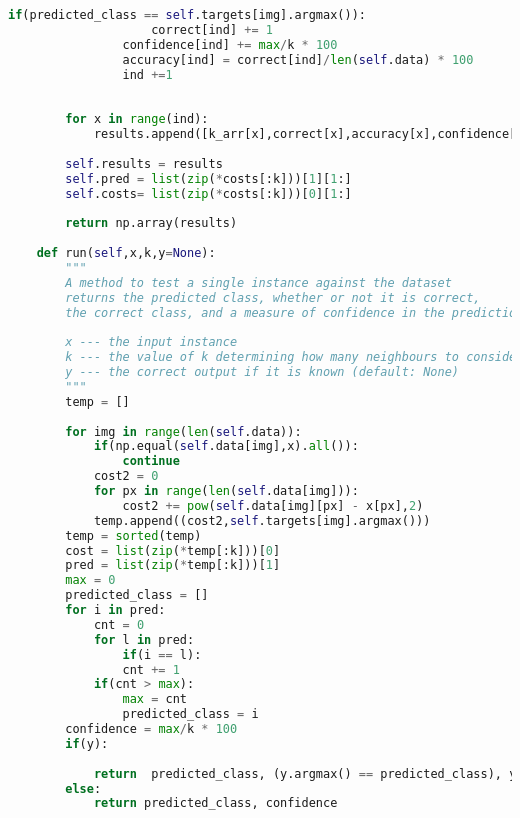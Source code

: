 \begin{lstlisting}[language=Python, caption=K Nearest Neighbours, captionpos=b, label={list:knn}]
				if(predicted_class == self.targets[img].argmax()):
					correct[ind] += 1
				confidence[ind] += max/k * 100
				accuracy[ind] = correct[ind]/len(self.data) * 100
				ind +=1 
		
		
		for x in range(ind):
			results.append([k_arr[x],correct[x],accuracy[x],confidence[x]])
		
		self.results = results  
		self.pred = list(zip(*costs[:k]))[1][1:]
		self.costs= list(zip(*costs[:k]))[0][1:]
		
		return np.array(results)
	
	def run(self,x,k,y=None):
		"""
		A method to test a single instance against the dataset
		returns the predicted class, whether or not it is correct, 
		the correct class, and a measure of confidence in the prediction
		
		x --- the input instance
		k --- the value of k determining how many neighbours to consider
		y --- the correct output if it is known (default: None)
		"""
		temp = []
		
		for img in range(len(self.data)):
			if(np.equal(self.data[img],x).all()):
				continue
			cost2 = 0
			for px in range(len(self.data[img])):
				cost2 += pow(self.data[img][px] - x[px],2)
			temp.append((cost2,self.targets[img].argmax()))
		temp = sorted(temp)
		cost = list(zip(*temp[:k]))[0]
		pred = list(zip(*temp[:k]))[1] 
		max = 0
		predicted_class = []
		for i in pred:
			cnt = 0
			for l in pred:	
				if(i == l):
				cnt += 1
			if(cnt > max):
				max = cnt
				predicted_class = i
		confidence = max/k * 100
		if(y):
		
			return  predicted_class, (y.argmax() == predicted_class), y.argmax(), confidence
		else:
			return predicted_class, confidence

\end{lstlisting}
